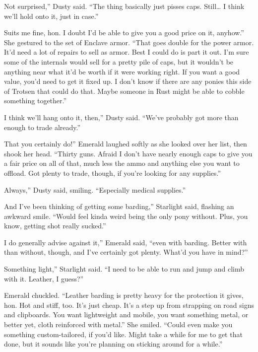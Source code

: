 \leavevmode{}Not surprised,” Dusty said. “The thing basically just pisses caps. Still… I think we’ll hold onto it, just in case.”

\leavevmode{}Suits me fine, hon. I doubt I’d be able to give you a good price on it, anyhow.” She gestured to the set of Enclave armor. “That goes double for the power armor. It’d need a lot of repairs to sell as armor. Best I could do is part it out. I’m sure some of the internals would sell for a pretty pile of caps, but it wouldn’t be anything near what it’d be worth if it were working right. If you want a good value, you’d need to get it fixed up. I don’t know if there are any ponies this side of Trotsen that could do that. Maybe someone in Rust might be able to cobble something together.”

\leavevmode{}I think we’ll hang onto it, then,” Dusty said. “We’ve probably got more than enough to trade already.”

\leavevmode{}That you certainly do!” Emerald laughed softly as she looked over her list, then shook her head. “Thirty guns. Afraid I don’t have nearly enough caps to give you a fair price on all of that, much less the ammo and anything else you want to offload. Got plenty to trade, though, if you’re looking for any supplies.”

\leavevmode{}Always,” Dusty said, smiling. “Especially medical supplies.”

\leavevmode{}And I’ve been thinking of getting some barding,” Starlight said, flashing an awkward smile. “Would feel kinda weird being the only pony without. Plus, you know, getting shot really sucked.”

\leavevmode{}I do generally advise against it,” Emerald said, “even with barding. Better with than without, though, and I’ve certainly got plenty. What’d you have in mind?”

\leavevmode{}Something light,” Starlight said. “I need to be able to run and jump and climb with it. Leather, I guess?”

Emerald chuckled. “Leather barding is pretty heavy for the protection it gives, hon. Hot and stiff, too. It’s just cheap. It’s a step up from strapping on road signs and clipboards. You want lightweight and mobile, you want something metal, or better yet, cloth reinforced with metal.” She smiled. “Could even make you something custom-tailored, if you’d like. Might take a while for me to get that done, but it sounds like you’re planning on sticking around for a while.”

